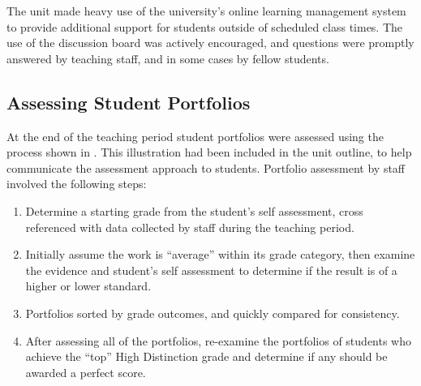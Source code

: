 The unit made heavy use of the university's online learning management system to provide additional support for students outside of scheduled class times. The use of the discussion board was actively encouraged, and questions were promptly answered by teaching staff, and in some cases by fellow students. 



\subsection{Assessing Student Portfolios} %
\label{sub:assessing_student_portfolios}

At the end of the teaching period student portfolios were assessed using the process shown in . This illustration had been included in the unit outline, to help communicate the assessment approach to students. Portfolio assessment by staff involved the following steps:

\begin{enumerate}
	\item Determine a starting grade from the student's self assessment, cross referenced with data collected by staff during the teaching period.
	\item Initially assume the work is ``average'' within its grade category, then examine the evidence and student's self assessment to determine if the result is of a higher or lower standard.
	\item Portfolios sorted by grade outcomes, and quickly compared for consistency.
	\item After assessing all of the portfolios, re-examine the portfolios of students who achieve the ``top'' High Distinction grade and determine if any should be awarded a perfect score.
\end{enumerate}

